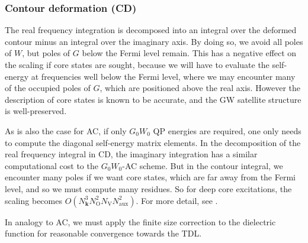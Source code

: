 \subsubsection{Contour deformation (CD)}
The real frequency integration is decomposed into an integral over the deformed contour minus an integral over the imaginary axis. By doing so, we avoid all poles of $W$, but poles of $G$ below the Fermi level remain. This has a negative effect on the scaling if core states are sought, because we will have to evaluate the self-energy at frequencies well below the Fermi level, where we may encounter many of the occupied poles of $G$, which are positioned above the real axis. However the description of core states is known to be accurate, and the GW satellite structure is well-preserved.
\begin{tcolorbox}[colback=blue!5!white,colframe=blue!75!black,title=Scaling analysis for extended systems]
As is also the case for AC, if only $G_0 W_0$ QP energies are required, one only needs to compute the diagonal self-energy matrix elements. In the decomposition of the real frequency integral in CD, the imaginary integration has a similar computational cost to the $G_0 W_0$-AC scheme. But in the contour integral, we encounter many poles if we want core states, which are far away from the Fermi level, and so we must compute many residues. So for deep core excitations, the scaling becomes $O\left(N_{\bm{k}}^3 N_{\mathrm{O}}^2 N_{\mathrm{V}} N_{\mathrm{aux}}^2\right)$. For more detail, see \cite{Zhu2020-nt}.
\end{tcolorbox}
In analogy to AC, we must apply the finite size correction to the dielectric function for reasonable convergence towards the TDL.
